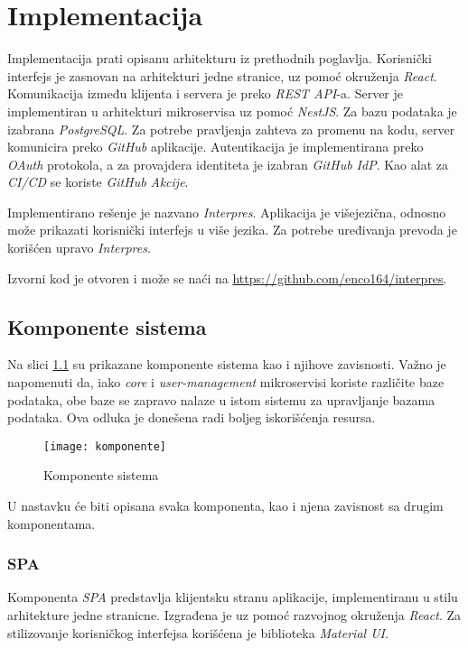 \chapter{Implementacija}\label{ch:impl}

Implementacija prati opisanu arhitekturu iz prethodnih poglavlja. 
Korisnički interfejs je zasnovan na arhitekturi jedne stranice, 
uz pomoć okruženja \textit{React}. Komunikacija između klijenta i servera 
je preko \textit{REST API}-a. Server je implementiran u arhitekturi
mikroservisa uz pomoć \textit{NestJS}. Za bazu podataka 
je izabrana \textit{PostgreSQL}. Za potrebe pravljenja zahteva za promenu 
na kodu, server komunicira preko \textit{GitHub} aplikacije. Autentikacija 
je implementirana preko \textit{OAuth} protokola, a za provajdera 
identiteta je izabran \textit{GitHub IdP}. Kao alat za \textit{CI/CD} se koriste 
\textit{GitHub Akcije}. 

Implementirano rešenje je nazvano \textit{Interpres}. Aplikacija je 
višejezična, odnosno može prikazati korisnički interfejs u više 
jezika. Za potrebe uređivanja prevoda je korišćen upravo \textit{Interpres}.

Izvorni kod je otvoren i može se naći na \url{https://github.com/enco164/interpres}.

\section{Komponente sistema}

Na slici \ref{fig:komponente} su prikazane komponente sistema kao i
njihove zavisnosti. Važno je napomenuti da, iako \textit{core} i 
\textit{user-management} mikroservisi koriste različite baze podataka,
obe baze se zapravo nalaze u istom sistemu za upravljanje bazama podataka. 
Ova odluka je donešena radi boljeg iskorišćenja resursa. 

\begin{figure}[h]
  \centering
  \texttt{[image: komponente]}
  \caption{Komponente sistema}
  \label{fig:komponente}
\end{figure}

U nastavku će biti opisana svaka komponenta, kao i njena 
zavisnost sa drugim komponentama.

\subsection{SPA}
Komponenta \textit{SPA} predstavlja klijentsku stranu aplikacije, implementiranu 
u stilu arhitekture jedne stranicne. Izgrađena je 
uz pomoć razvojnog okruženja \textit{React}. Za stilizovanje korisničkog 
interfejsa korišćena je biblioteka \textit{Material UI}. 

